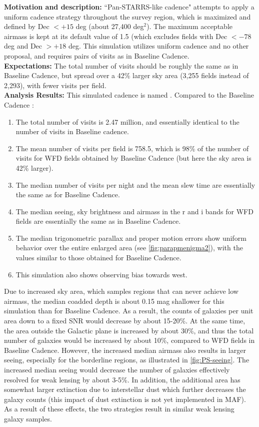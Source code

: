 {\bf Motivation and description:} ``Pan-STARRS-like cadence" attempts
to apply a uniform cadence strategy throughout the survey region,
which is maximized and defined by Dec $< +15$ deg (about 27,400
deg$^2$). The maximum acceptable airmass is kept at its default value
of 1.5 (which excludes fields with Dec $< -78$ deg and Dec $> +18$
deg. This simulation utilizes uniform cadence and no other proposal,
and requires pairs of visits as in Baseline Cadence. \\

{\bf Expectations:} The total number of visits should be roughly the
same as in Baseline Cadence, but spread over a 42\% larger sky area
(3,255 fields instead of 2,293), with fewer visits per field. \\

{\bf Analysis Results:}  This simulated cadence is named .
Compared to the Baseline Cadence :
\begin{enumerate}
\item The total number of visits is 2.47 million, and essentially identical to the
number of visits in Baseline cadence.
\item
The mean number of visits per field is 758.5, which is 98\% of the number of visits
for WFD fields obtained by Baseline Cadence (but here the sky area is 42\% larger).
\item The median number of visits per night and the mean slew time are
essentially the same as for Baseline Cadence.
\item The median seeing, sky brightness and airmass in the r and i bands for WFD fields are
         essentially the same as in Baseline Cadence.
\item The median trigonometric parallax and proper motion errors show
uniform behavior over the entire enlarged area (see \autoref{fig:parapmenigma2}),
with the values similar to those obtained for Baseline Cadence.
\item This simulation also shows observing bias towards west.
\end{enumerate}

Due to increased sky area, which samples regions that can never
achieve low airmass, the median coadded depth is about 0.15 mag
shallower for this simulation than for Baseline Cadence. As a result,
the counts of galaxies per unit area down to a fixed SNR would
decrease by about 15-20\%. At the same time, the area outside the
Galactic plane is increased by about 30\%, and thus the total number
of galaxies would be increased by about 10\%, compared to WFD fields
in Baseline Cadence. However, the increased median airmass also
results in larger seeing, especially for the borderline regions, as
illustrated in \autoref{fig:PS-seeing}. The increased median seeing
would decrease the number of galaxies effectively resolved for weak
lensing by about 3-5\%. In addition, the additional area has somewhat
larger extinction due to interstellar dust which further decreases the
galaxy counts (this impact of dust extinction is not yet implemented
in MAF). As a result of these effects, the two strategies result in
similar weak lensing galaxy samples.

